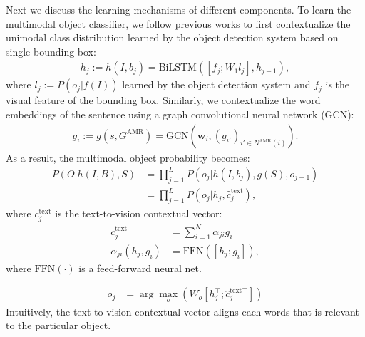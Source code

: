\documentclass[11pt,a4paper]{article}
\newcommand{\bw}{\mathbf{w}}
\begin{document}
Next we discuss the learning mechanisms of different components. To learn the multimodal object classifier, we follow previous works \cite{Zellers2018-neural-motifs} to first contextualize the unimodal class distribution learned by the object detection system based on single bounding box:
\begin{align}\label{eq:contextualized_object_prob}
    h_j := h(I, b_j) = \text{BiLSTM}([f_j;W_1 l_j], h_{j-1}),
\end{align}
where $l_j := P(o_j|f(I))$ learned by the object detection system and $f_j$ is the visual feature of the bounding box. Similarly, we contextualize the word embeddings of the sentence using a graph convolutional neural network (GCN):
\begin{align}
    g_i := g(s, G^{\text{AMR}}) = \text{GCN}(\bw_i, (g_{i'})_{i'\in N^{\text{AMR}}(i)}).
\end{align}
As a result, the multimodal object probability becomes:
\begin{align}
    P(O|h(I,B), S) &= \prod_{j=1}^L P(o_j|h(I, b_j), g(S), o_{j-1})\\
    &= \prod_{j=1}^L P(o_j|h_j, \hat{c}^{\text{text}}_j),
\end{align}
where $c_j^{\text{text}}$ is the text-to-vision contextual vector:
\begin{align}
    c_j^{\text{text}} &= \sum_{i=1}^N \alpha_{ji} g_i\\
    \alpha_{ji}(h_j, g_i) &= \text{FFN}([h_j;g_i]),
\end{align}
where $\text{FFN}(\cdot)$ is a feed-forward neural net.

\begin{align}
    \hat{o}_j &= \arg\max_{o}(W_o [h_j^\top; \hat{c}_j^{\text{text}\top}])
\end{align}
Intuitively, the text-to-vision contextual vector aligns each words that is relevant to the particular object. 
\end{document}
